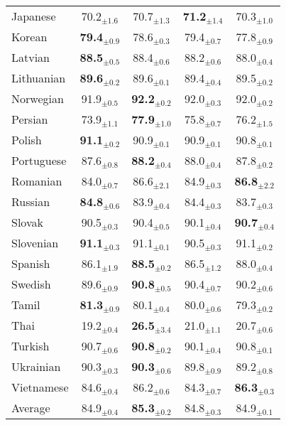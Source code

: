 \begin{table*}[ht]
{{\begin{tabular}{lcccc}
Japanese & 70.2$_{\pm 1.6}$ & 70.7$_{\pm 1.3}$ & \textbf{71.2}$_{\pm 1.4}$ & 70.3$_{\pm 1.0}$ \\
Korean & \textbf{79.4}$_{\pm 0.9}$ & 78.6$_{\pm 0.3}$ & 79.4$_{\pm 0.7}$ & 77.8$_{\pm 0.9}$ \\
Latvian & \textbf{88.5}$_{\pm 0.5}$ & 88.4$_{\pm 0.6}$ & 88.2$_{\pm 0.6}$ & 88.0$_{\pm 0.4}$ \\
Lithuanian & \textbf{89.6}$_{\pm 0.2}$ & 89.6$_{\pm 0.1}$ & 89.4$_{\pm 0.4}$ & 89.5$_{\pm 0.2}$ \\
Norwegian & 91.9$_{\pm 0.5}$ & \textbf{92.2}$_{\pm 0.2}$ & 92.0$_{\pm 0.3}$ & 92.0$_{\pm 0.2}$ \\
Persian & 73.9$_{\pm 1.1}$ & \textbf{77.9}$_{\pm 1.0}$ & 75.8$_{\pm 0.7}$ & 76.2$_{\pm 1.5}$ \\
Polish & \textbf{91.1}$_{\pm 0.2}$ & 90.9$_{\pm 0.1}$ & 90.9$_{\pm 0.1}$ & 90.8$_{\pm 0.1}$ \\
Portuguese & 87.6$_{\pm 0.8}$ & \textbf{88.2}$_{\pm 0.4}$ & 88.0$_{\pm 0.4}$ & 87.8$_{\pm 0.2}$ \\
Romanian & 84.0$_{\pm 0.7}$ & 86.6$_{\pm 2.1}$ & 84.9$_{\pm 0.3}$ & \textbf{86.8}$_{\pm 2.2}$ \\
Russian & \textbf{84.8}$_{\pm 0.6}$ & 83.9$_{\pm 0.4}$ & 84.4$_{\pm 0.3}$ & 83.7$_{\pm 0.3}$ \\
Slovak & 90.5$_{\pm 0.3}$ & 90.4$_{\pm 0.5}$ & 90.1$_{\pm 0.4}$ & \textbf{90.7}$_{\pm 0.4}$ \\
Slovenian & \textbf{91.1}$_{\pm 0.3}$ & 91.1$_{\pm 0.1}$ & 90.5$_{\pm 0.3}$ & 91.1$_{\pm 0.2}$ \\
Spanish & 86.1$_{\pm 1.9}$ & \textbf{88.5}$_{\pm 0.2}$ & 86.5$_{\pm 1.2}$ & 88.0$_{\pm 0.4}$ \\
Swedish & 89.6$_{\pm 0.9}$ & \textbf{90.8}$_{\pm 0.5}$ & 90.4$_{\pm 0.7}$ & 90.2$_{\pm 0.6}$ \\
Tamil & \textbf{81.3}$_{\pm 0.9}$ & 80.1$_{\pm 0.4}$ & 80.0$_{\pm 0.6}$ & 79.3$_{\pm 0.2}$ \\
Thai & 19.2$_{\pm 0.4}$ & \textbf{26.5}$_{\pm 3.4}$ & 21.0$_{\pm 1.1}$ & 20.7$_{\pm 0.6}$ \\
Turkish & 90.7$_{\pm 0.6}$ & \textbf{90.8}$_{\pm 0.2}$ & 90.1$_{\pm 0.4}$ & 90.8$_{\pm 0.1}$ \\
Ukrainian & 90.3$_{\pm 0.3}$ & \textbf{90.3}$_{\pm 0.6}$ & 89.8$_{\pm 0.9}$ & 89.2$_{\pm 0.8}$ \\
Vietnamese & 84.6$_{\pm 0.4}$ & 86.2$_{\pm 0.6}$ & 84.3$_{\pm 0.7}$ & \textbf{86.3}$_{\pm 0.3}$ \\
\hline
Average & 84.9$_{\pm 0.4}$ & \textbf{85.3}$_{\pm 0.2}$ & 84.8$_{\pm 0.3}$ & 84.9$_{\pm 0.1}$ \\
        \hline
        \end{tabular}
        }
        }
        \caption{}
        \label{table:results_XLMR_NER_before}
        \end{table*}